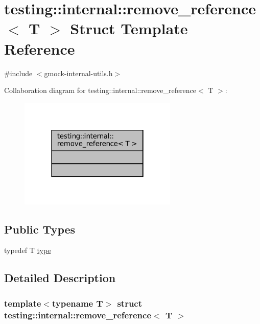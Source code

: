 \hypertarget{structtesting_1_1internal_1_1remove__reference}{}\section{testing\+:\+:internal\+:\+:remove\+\_\+reference$<$ T $>$ Struct Template Reference}
\label{structtesting_1_1internal_1_1remove__reference}


{\ttfamily \#include $<$gmock-\/internal-\/utils.\+h$>$}



Collaboration diagram for testing\+:\+:internal\+:\+:remove\+\_\+reference$<$ T $>$\+:
\nopagebreak
\begin{figure}[H]
\begin{center}
\leavevmode
\includegraphics[width=214pt]{structtesting_1_1internal_1_1remove__reference__coll__graph}
\end{center}
\end{figure}
\subsection*{Public Types}
\begin{DoxyCompactItemize}
\item 
typedef T \hyperlink{structtesting_1_1internal_1_1remove__reference_a291edca52c59a0d211977d4802439b8a}{type}
\end{DoxyCompactItemize}


\subsection{Detailed Description}
\subsubsection*{template$<$typename T$>$\newline
struct testing\+::internal\+::remove\+\_\+reference$<$ T $>$}



